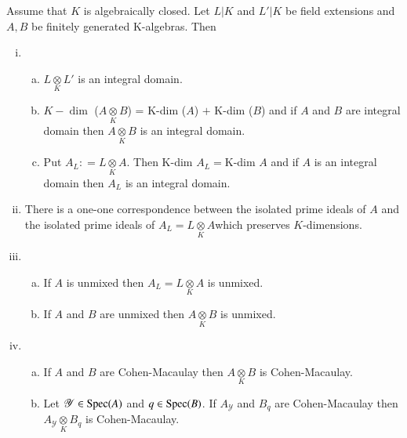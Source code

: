 \setcounter{proposition}{46}
\begin{proposition}\label{chap1:sec4:prop1.47}
  Assume that $K$ is algebraically closed. Let $L|K$ and $L'|K$
  be field extensions and $A,B$ be finitely generated
  K-algebras. Then 
  \begin{enumerate}[(i)]
  \item
    \begin{enumerate}[(a)]
    \item $L \underset{K}{\otimes} L'$ is an integral domain.
    \item  $K-\dim$ ($A \underset{K}{\otimes} B$) = K-dim ($A$) $+$ K-dim
      ($B$) and if $A$ and $B$ are integral domain then $A
      \underset{K}{\otimes} B$ is an integral domain.
    \item Put $A_L:  = L \underset{K}{\otimes} A$. Then K-dim $A_L =
      $K-dim $A$ and if $A$ is an integral domain then $A_L$ is an
      integral domain. 
    \end{enumerate}
  \item There is a one-one correspondence between the isolated
    prime ideals of $A$ and the isolated prime ideals of  $A_L = L
    \underset{K}{\otimes} A$\pageoriginale which preserves $K$-dimensions. 
  \item 
    \begin{enumerate}[(a)]
    \item If $A$ is unmixed then $A_L = L \underset{K}{\otimes}
      A$ is unmixed. 
    \item If $A$ and $B$ are unmixed then $A
      \underset{K}{\otimes} B$ is unmixed. 
    \end{enumerate}
  \item 
    \begin{enumerate}[(a)]
    \item If $A$ and $B$ are Cohen-Macaulay then $A
      \underset{K}{\otimes} B$ is Cohen-Macaulay. 
    \item Let $\mathscr{Y} \in \operatorname{Spec} (A)$ and $q \in 
      \operatorname{Spec} (B)$. If $A_{\mathscr{Y}}$ and $B_q$ are
      Cohen-Macaulay then $A_{\mathscr{Y}} \underset{K}{\otimes} B_q$ is
      Cohen-Macaulay.  
    \end{enumerate}
  \end{enumerate}
\end{proposition}

